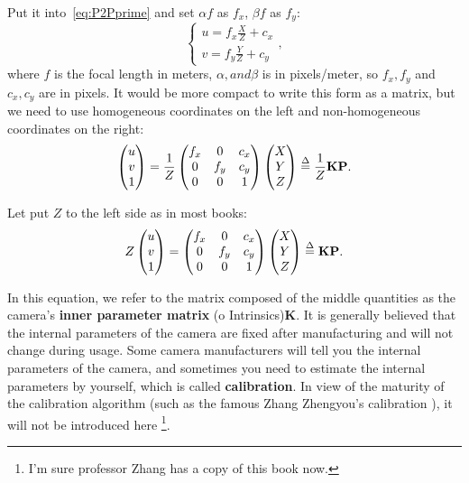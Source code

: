 Put it into~\eqref{eq:P2Pprime} and set $\alpha f$ as $f_x$, $\beta f$ as $f_y$:
\begin{equation}
\left\{
\begin{matrix} 
u=f_x\frac{X}{Z} + c_x\\ 
v=f_y\frac{Y}{Z} + c_y
\end{matrix}
\right. ,
\end{equation}
where $f$ is the focal length in meters, $\alpha, and \beta$ is in pixels/meter, so $f_x, f_y$ and $c_x, c_y$ are in pixels. It would be more compact to write this form as a matrix, but we need to use homogeneous coordinates on the left and non-homogeneous coordinates on the right:
\begin{equation}
\label{eq:intrinmatrix} 
\begin{pmatrix} u\\ v\\ 1 \end{pmatrix}=\frac{1}{Z}\begin{pmatrix} f_x & 0&c_x \\ 0& f_y& c_y\\ 0&0 & 1 \end{pmatrix}\begin{pmatrix} X\\ Y\\ Z \end{pmatrix} 
\buildrel \Delta \over =\frac{1}{Z} \mathbf{K} \mathbf{P}.
\end{equation}

Let put $Z$ to the left side as in most books:
\begin{equation}
Z \begin{pmatrix} u\\ v\\ 1 \end{pmatrix}= \begin{pmatrix} f_x & 0&c_x \\ 0& f_y& c_y\\ 0&0 & 1 \end{pmatrix}\begin{pmatrix} X\\ Y\\ Z \end{pmatrix} 
\buildrel \Delta \over = \mathbf{K} \mathbf{P}.
\end{equation}

In this equation, we refer to the matrix composed of the middle quantities as the camera's \textbf{inner parameter matrix} (o Intrinsics)$\mathbf{K}$. It is generally believed that the internal parameters of the camera are fixed after manufacturing and will not change during usage. Some camera manufacturers will tell you the internal parameters of the camera, and sometimes you need to estimate the internal parameters by yourself, which is called \textbf{calibration}. In view of the maturity of the calibration algorithm (such as the famous Zhang Zhengyou's calibration \textsuperscript{\cite{Zhang1999}}), it will not be introduced here \footnote{I'm sure professor Zhang has a copy of this book now.}. 

